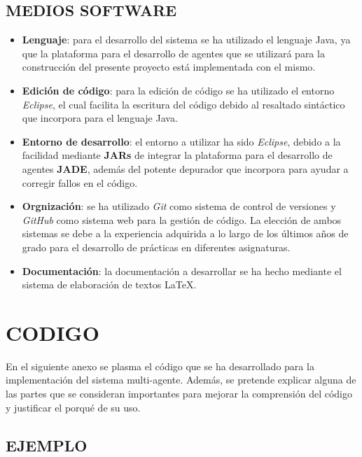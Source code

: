 \documentclass{pre-tfg}
\begin{document}
\subsection{MEDIOS SOFTWARE}

\begin{itemize}
 \item \textbf{Lenguaje}: para el desarrollo del sistema se ha utilizado el lenguaje Java, ya que la plataforma para el desarrollo 
 de agentes que se utilizará para la construcción del presente proyecto está implementada con el mismo.
 \item \textbf{Edición de código}: para la edición de código se ha utilizado el entorno \textit{Eclipse}, el cual facilita la escritura 
 del código debido al resaltado sintáctico que incorpora para el lenguaje Java.
 \item \textbf{Entorno de desarrollo}: el entorno a utilizar ha sido \textit{Eclipse}, debido a la facilidad mediante \textbf{JARs} de 
 integrar la plataforma para el desarrollo de agentes \textbf{JADE}, además del potente depurador que incorpora para ayudar a 
 corregir fallos en el código.
 \item \textbf{Orgnización}: se ha utilizado \textit{Git} como sistema de control de versiones y \textit{GitHub} como sistema web
 para la gestión de código. La elección de ambos sistemas se debe a la experiencia adquirida a lo largo de los últimos años de grado
 para el desarrollo de prácticas en diferentes asignaturas.
 \item \textbf{Documentación}: la documentación a desarrollar se ha hecho mediante el sistema de elaboración de textos \LaTeX.
\end{itemize}

\newpage

\appendix
\section{CODIGO}

En el siguiente anexo se plasma el código que se ha desarrollado para la implementación del sistema multi-agente. Además,
se pretende explicar alguna de las partes que se consideran importantes para mejorar la comprensión del código y justificar
el porqué de su uso.

\subsection{EJEMPLO}
\end{document}
